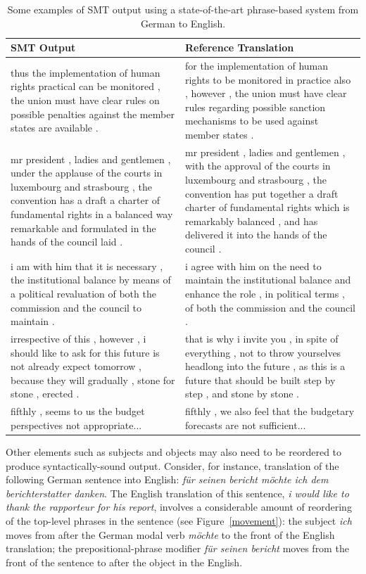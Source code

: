\documentclass[11pt]{report}
\theoremstyle{plain}
\begin{document}
{\begin{table}
\caption{Some examples of SMT output using a state-of-the-art
phrase-based system from German to English.}
\begin{center}
\begin{tabular}{p{2.25in}p{2.25in}}
{\bf SMT Output} & {\bf Reference Translation}\\
\hline
thus the implementation of human rights practical can be monitored , the union must have clear rules on possible penalties against the member states are available . & for the implementation of human rights to be monitored in practice also , however , the union must have clear rules regarding possible sanction mechanisms to be used against member states . \\
\hline
mr president , ladies and gentlemen , under the applause of the courts in luxembourg and strasbourg , the convention has a draft a charter of fundamental rights in a balanced way remarkable and formulated in the hands of the council laid . & mr president , ladies and gentlemen , with the approval of the courts in luxembourg and strasbourg , the convention has put together a draft charter of fundamental rights which is remarkably balanced , and has delivered it into the hands of the council . \\
\hline
i am with him that it is necessary , the institutional balance by means of a political revaluation of both the commission and the council to maintain . & i agree with him on the need to maintain the institutional balance and enhance the role , in political terms , of both the commission and the council . \\
\hline
irrespective of this , however , i should like to ask for this future is not already expect tomorrow , because they will gradually , stone for stone , erected . & that is why i invite you , in spite of everything , not to throw yourselves headlong into the future , as this is a future that should be built step by step , and stone by stone . \\
\hline
fifthly , seems to us the budget perspectives not appropriate... & fifthly , we also feel that the budgetary forecasts are not sufficient... \\
\hline
\end{tabular}
\end{center}
\label{SMTexamples}
\end{table}%

Other elements such as subjects and objects may also need to be
reordered to produce syntactically-sound output. Consider, for
instance, translation of the following German sentence into English:
{\em f\"{u}r seinen bericht m\"{o}chte ich dem berichterstatter
danken}. The English translation of this sentence, {\em i would like
to thank the rapporteur for his report}, involves a considerable
amount of reordering of the top-level phrases in the sentence (see
Figure~\ref{movement}): the subject {\em ich} moves from after the
German modal verb {\em m\"{o}chte} to the front of the English
translation; the prepositional-phrase modifier {\em f\"{u}r seinen
bericht} moves from the front of the sentence to after the object in
the English.

}
\end{document}
